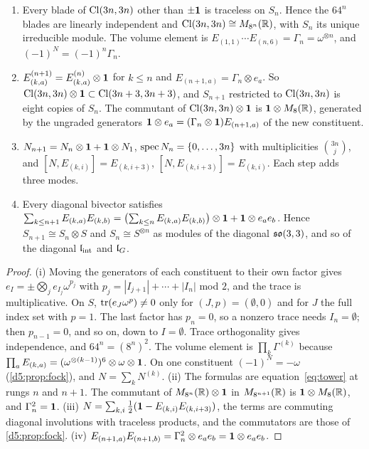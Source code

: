 \begin{proposition}
\label{e3:prop:rung}
\begin{enumerate}[label=(\roman*),leftmargin=2.2em]
\item Every blade of $\mathrm{Cl}(3n,3n)$ other than $\pm\mathbf 1$ is traceless on $S_n$. Hence the $64^n$ blades are linearly independent and
$\mathrm{Cl}(3n,3n)\cong M_{8^n}(\mathbb{R})$, with $S_n$ its unique irreducible module. The volume element is $E_{(1,1)}\cdots E_{(n,6)}=\Gamma_n=\omega^{\otimes n}$, and
$(-1)^N=(-1)^n\Gamma_n$.
\item $E^{(n+1)}_{(k,a)}=E^{(n)}_{(k,a)}\otimes\mathbf 1$ for $k\le n$ and $E_{(n+1,a)}=\Gamma_n\otimes e_a$. So $\mathrm{Cl}(3n,3n)\otimes\mathbf 1\subset\mathrm{Cl}(3n+3,3n+3)$, and
$S_{n+1}$ restricted to $\mathrm{Cl}(3n,3n)$ is eight copies of $S_n$. The commutant of $\mathrm{Cl}(3n,3n)\otimes\mathbf 1$ is $\mathbf 1\otimes M_8(\mathbb{R})$, generated by the
ungraded generators $\mathbf 1\otimes e_a=(\Gamma_n\otimes\mathbf 1)E_{(n+1,a)}$ of the new constituent.
\item $N_{n+1}=N_n\otimes\mathbf 1+\mathbf 1\otimes N_1$, $\operatorname{spec} N_n=\{0,\dots,3n\}$ with multiplicities $\binom{3n}j$, and $[N,E_{(k,i)}]=E_{(k,i+3)}$,
$[N,E_{(k,i+3)}]=E_{(k,i)}$. Each step adds three modes.
\item Every diagonal bivector satisfies $\sum_{k\le n+1}E_{(k,a)}E_{(k,b)}=\bigl(\sum_{k\le n}E_{(k,a)}E_{(k,b)}\bigr)\otimes\mathbf 1+\mathbf 1\otimes e_ae_b$. Hence
$S_{n+1}\cong S_n\otimes S$ and $S_n\cong S^{\otimes n}$ as modules of the diagonal $\mathfrak{so}(3,3)$, and so of the diagonal $\mathfrak l_{\rm int}$ and $\mathfrak l_G$.
\end{enumerate}
\end{proposition}

\begin{proof}
(i) Moving the generators of each constituent to their own factor gives $e_I=\pm\bigotimes_je_{I_j}\omega^{p_j}$ with $p_j=|I_{j+1}|+\cdots+|I_n|$ mod $2$, and
the trace is multiplicative. On $S$, $\operatorname{tr}(e_J\omega^p)\ne0$ only for $(J,p)=(\emptyset,0)$ and for $J$ the full index set with $p=1$. The last
factor has $p_n=0$, so a nonzero trace needs $I_n=\emptyset$; then $p_{n-1}=0$, and so on, down to $I=\emptyset$. Trace orthogonality gives
independence, and $64^n=(8^n)^2$. The volume element is $\prod_k\Gamma^{(k)}$ because $\prod_aE_{(k,a)}=(\omega^{\otimes(k-1)})^6\otimes\omega\otimes\mathbf 1$. On one
constituent $(-1)^N=-\omega$ (\cref{d5:prop:fock}), and $N=\sum_kN^{(k)}$. (ii) The formulas are equation~\cref{eq:tower} at rungs $n$
and $n+1$. The commutant of $M_{8^n}(\mathbb{R})\otimes\mathbf 1$ in $M_{8^{n+1}}(\mathbb{R})$ is $\mathbf 1\otimes M_8(\mathbb{R})$, and $\Gamma_n^2=\mathbf 1$. (iii) $N=\sum_{k,i}\tfrac12(\mathbf 1-E_{(k,i)}E_{(k,i+3)})$,
the terms are commuting diagonal involutions with traceless products, and the commutators are those of \cref{d5:prop:fock}. (iv)
$E_{(n+1,a)}E_{(n+1,b)}=\Gamma_n^2\otimes e_ae_b=\mathbf 1\otimes e_ae_b$.
\end{proof}

